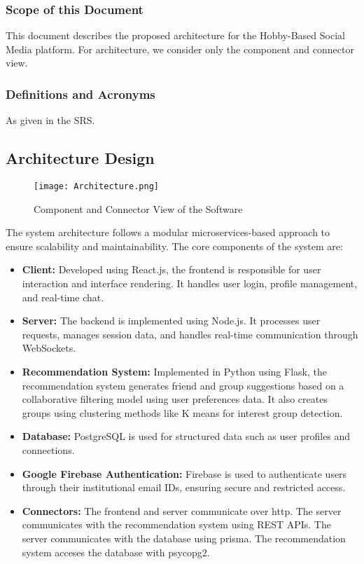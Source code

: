 \documentclass[12pt,a4paper]{article}
\begin{document}
\subsubsection{Scope of this Document}
This document describes the proposed architecture for the Hobby-Based Social Media platform. For architecture, we consider only the component and connector view.

\subsubsection{Definitions and Acronyms}
As given in the SRS.

\subsection{Architecture Design}
\begin{figure}[H]
  \centering
  \texttt{[image: Architecture.png]}
  \caption{Component and Connector View of the Software}
  \label{fig:architecture}
\end{figure}
The system architecture follows a modular microservices-based approach to ensure scalability and maintainability. The core components of the system are:
\begin{itemize}
    \item \textbf{Client:} Developed using React.js, the frontend is responsible for user interaction and interface rendering. 
    It handles user login, profile management, and real-time chat.
    
    \item \textbf{Server:} The backend is implemented using Node.js. It processes user requests, manages session data, and handles real-time communication through WebSockets.
    
    \item \textbf{Recommendation System:} Implemented in Python using Flask, the recommendation system generates friend and group suggestions based on a collaborative filtering model using user preferences data. It also creates groups using clustering methods like K means for interest group detection.
    
    \item \textbf{Database:} PostgreSQL is used for structured data such as user profiles and connections.
    
    \item \textbf{Google Firebase Authentication:} Firebase is used to authenticate users through their institutional email IDs, ensuring secure and restricted access.
    
    \item \textbf{Connectors:} The frontend and server communicate over http. The server communicates with the recommendation system using REST APIs. The server communicates with the database using prisma. The recommendation system acceses the database with psycopg2.
\end{itemize}
\end{document}

